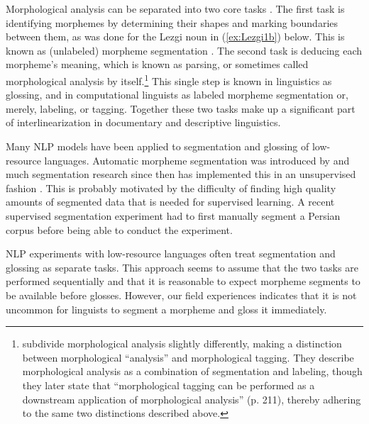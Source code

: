 Morphological analysis can be separated into two core tasks \citep{cotterell_labeled_2015,hammarstrom_unsupervised_2011,nicolai_morphological_2017,palmer_semi-automated_2009}. The first task is identifying morphemes by determining their shapes and marking boundaries between them, as was done for the Lezgi noun in (\ref{ex:Lezgi1b}) below. This is known as (unlabeled) morpheme segmentation \citep{creutz_unsupervised_2007,snyder_unsupervised_2008}. The second task is deducing each morpheme's meaning, which is known as parsing, or sometimes called morphological analysis by itself.\footnote{\cite{nicolai_morphological_2017} subdivide morphological analysis slightly differently, making a distinction between morphological “analysis” and morphological tagging. They describe morphological analysis as a combination of segmentation and labeling, though they later state that ``morphological tagging can be performed as a downstream application of morphological analysis'' (p. 211), thereby adhering to the same two distinctions described above.} This single step is known in linguistics as glossing, and in computational linguists as labeled morpheme segmentation or, merely, labeling, or tagging. Together these two tasks make up a significant part of interlinearization in documentary and descriptive linguistics.

Many NLP models have been applied to segmentation and glossing of low-resource languages. Automatic morpheme segmentation was introduced by \citet{harris_phoneme_1970} and much segmentation research since then has implemented this in an unsupervised fashion \cite{goldsmith_unsupervised_2001,creutz_unsupervised_2002,poon_unsupervised_2009}. This is probably motivated by the difficulty of finding high quality amounts of segmented data that is needed for supervised learning. A recent supervised segmentation experiment \cite{ansari_supervised_2019} had to first manually segment a Persian corpus before being able to conduct the experiment. 

NLP experiments with low-resource languages often treat segmentation and glossing as separate tasks. This approach seems to assume that the two tasks are performed sequentially and that it is reasonable to expect morpheme segments to be available before glosses. However, our field experiences indicates that it is not uncommon for linguists to segment a morpheme and gloss it immediately. 

